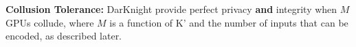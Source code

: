 \textbf{Collusion Tolerance:} DarKnight provide perfect privacy \textbf{and} integrity  when $M$ GPUs collude, where $M$ is a function of K' and the number of inputs that can be encoded, as described later. 
\begin{comment}
\subsection{Privacy Overview} 
To prevent leakage, the cloud server uses a TEE-based code enclave. The TEE hardware guarantees code verification and authentication. An enclave code can be verified by the client. In particular, the client can verify what computations are performed by the enclave on the data it receives, and what data the enclave may communicate to the outside world such as the accelerator GPUs. After verification, the client can also authenticate that the enclave code that runs at any instance is the same code that was verified and any deviation will be notified to the client. Note that these are basic properties of a hardware-supported TEE and there is nothing unique either the client or the cloud server may need to perform to achieve these guarantees. %

We assume that the communication between the TEE  and GPUs are encrypted. A pairwise secure channel between TEE and each GPU can be established using a secret key exchange using Diffie-Hellman~\cite{steiner1996diffie} protocol at the beginning of the session.  All the messages that leave the TEE are encrypted with the appropriate secret key. 

Input privacy on the accelerators is guaranteed by our proposed encoding scheme, which obfuscates the original input. Each GPU only receives \emph{one} encoded data. The amount of leaked information from encoded data to accelerator GPUs has a rigorous upper bound. This upper bound itself can be controlled by the power of noise and other encoding parameters in our design. In our implementation, we selected these parameters such that the overall training or inference accuracy is not reduced due to computations on noise encoded data. In section~\ref{sec:guarantee} and Appendix~\ref{ap:pri}, we provide the details of our theoretical analysis.

\textbf{Computation Integrity Overview:}
The malicious GPUs can alter the returned values to the TEE to manipulate model training or inference. DarKnight can verify the computations performed in the unsecured GPUs up to the computation precision. In the other words, DarKnight detects if the results are altered more than the computation precision by an adversary. 
\end{comment}
